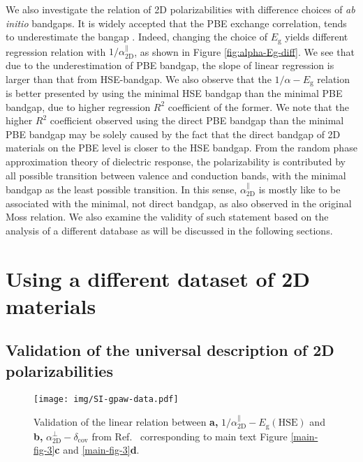 \documentclass[manuscript=suppinfo,email=true,hyperref=true,keywords=false]{achemso}
\begin{document}
We also investigate the relation of 2D polarizabilities with
difference choices of \textit{ab initio} bandgaps. It is widely
accepted that the PBE exchange correlation, tends to underestimate the
bangap \cite{Heyd_2005,Kumar_2016_PRB,Kumar_2016_jpcc}.  Indeed,
changing the choice of $E_{\mathrm{g}}$ yields different regression
relation with $1/\alpha_{\mathrm{2D}}^{\parallel}$, as shown in Figure
\ref{fig:alpha-Eg-diff}. We see that due to the underestimation of PBE
bandgap, the slope of linear regression is larger than that from
HSE-bandgap. We also observe that the $1/\alpha-E_{\mathrm{g}}$
relation is better presented by using the minimal HSE bandgap than the
minimal PBE bandgap, due to higher regression $R^{2}$ coefficient of
the former. We note that the higher $R^{2}$ coefficient observed using
the direct PBE bandgap than the minimal PBE bandgap may be solely
caused by the fact that the direct bandgap of 2D materials on the PBE
level is closer to the HSE bandgap. From the random phase
approximation theory of dielectric response, the polarizability is
contributed by all possible transition between valence and conduction
bands, with the minimal bandgap as the least possible transition. In
this sense, $\alpha_{\mathrm{2D}}^{\parallel}$ is mostly like to be associated with
the minimal, not direct bandgap, as also observed in the original Moss
relation. We also examine the validity of such statement based on the
analysis of a different database\cite{Haastrup_2018} 
as will be discussed in the following sections.


\section{Using a different dataset of 2D materials}
\label{sec:gpaw}
\subsection{Validation of the universal description of 2D polarizabilities}
\label{sec:gpaw-1}

\begin{figure}[htbp]
  \centering
  \texttt{[image: img/SI-gpaw-data.pdf]}
  \caption{Validation of the linear relation between \textbf{a,}
    $1/\alpha_{\mathrm{2D}}^{\parallel}-E_{\mathrm{g}}(\mathrm{HSE})$
    and \textbf{b,}
    $\alpha_{\mathrm{2D}}^{\perp}-\delta_{\mathrm{cov}}$ from 
    Ref.~ corresponding to main text Figure \ref{main-fig-3}{\bf c}
    and \ref{main-fig-3}{\bf d}.}
  \label{fig:gpaw-alpha-relation}
\end{figure}
\end{document}

